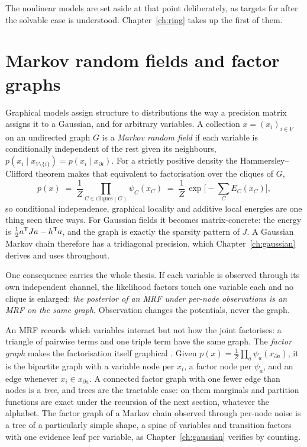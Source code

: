 The nonlinear models are set aside at that point deliberately, as targets for
after the solvable case is understood. Chapter~\ref{ch:ring} takes up the
first of them.


\section{Markov random fields and factor graphs}\label{sec:mrf}
\label{sec:factor-graphs}

Graphical models assign structure to distributions the way a precision matrix
assigns it to a Gaussian, and for arbitrary variables. A collection
$x = (x_i)_{i \in V}$ on an undirected graph $G$ is a \emph{Markov random field}
if each variable is conditionally independent of the rest given its neighbours,
$p(x_i \mid x_{V \setminus \{i\}}) = p(x_i \mid x_{\partial i})$. For a
strictly positive density the Hammersley--Clifford theorem
\citep{besag1974spatial} makes that equivalent to factorisation over the cliques
of $G$,
\begin{equation}
  p(x) \;=\; \frac{1}{Z} \prod_{C \in \mathrm{cliques}(G)} \psi_C(x_C)
  \;=\; \frac{1}{Z}\, \exp\Big[ -\sum_C E_C(x_C) \Big] ,
  \label{eq:hammersley-clifford}
\end{equation}
so conditional independence, graphical locality and additive local energies are
one thing seen three ways. For Gaussian fields it becomes matrix-concrete: the
energy is $\tfrac12 a^{\mathsf{T}} J a - h^{\mathsf{T}} a$, and the graph is exactly the sparsity
pattern of $J$. A Gaussian Markov chain therefore has a tridiagonal precision,
which Chapter~\ref{ch:gaussian} derives and uses throughout.

One consequence carries the whole thesis. If each variable is observed through
its own independent channel, the likelihood factors touch one variable each and
no clique is enlarged: \emph{the posterior of an MRF under per-node observations
is an MRF on the same graph}. Observation changes the potentials, never the
graph.

An MRF records which variables interact but not how the joint factorises: a
triangle of pairwise terms and one triple term have the same graph. The
\emph{factor graph} makes the factorisation itself graphical
\citep{kschischang2001factor}. Given
$p(x) = \frac{1}{Z}\prod_a \psi_a(x_{\partial a})$, it is the bipartite graph
with a variable node per $x_i$, a factor node per $\psi_a$, and an edge whenever
$x_i \in x_{\partial a}$. A connected factor graph with one fewer edge than
nodes is a \emph{tree}, and trees are the tractable case: on them marginals and
partition functions are exact under the recursion of the next section, whatever
the alphabet. The factor graph of a Markov chain observed through per-node
noise is a tree of a particularly simple shape, a spine of variables and
transition factors with one evidence leaf per variable, as
Chapter~\ref{ch:gaussian} verifies by counting.

